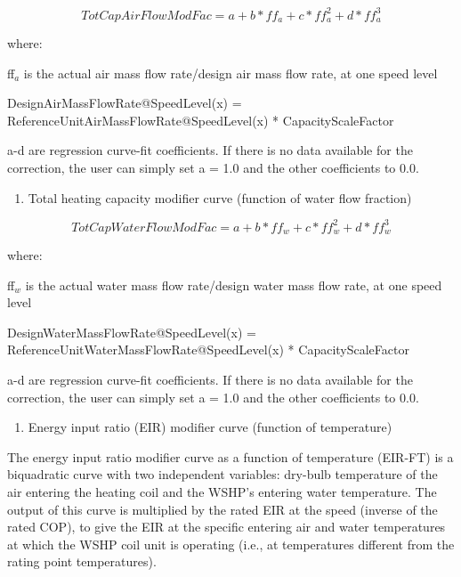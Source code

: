 \begin{equation}
TotCapAirFlowModFac = a + b*f{f_a} + c*ff_a^2 + d*ff_a^3
\end{equation}

where:

ff\(_{a}\) is the actual air mass flow rate/design air mass flow rate, at one speed level

DesignAirMassFlowRate@SpeedLevel(x) = ReferenceUnitAirMassFlowRate@SpeedLevel(x) * CapacityScaleFactor

a-d are regression curve-fit coefficients.  If there is no data available for the correction, the user can simply set a = 1.0 and the other coefficients to 0.0.

\begin{enumerate}
\def\labelenumi{\arabic{enumi})}
\setcounter{enumi}{2}
\tightlist
\item
  Total heating capacity modifier curve (function of water flow fraction)
\end{enumerate}

\begin{equation}
TotCapWaterFlowModFac = a + b*f{f_w} + c*ff_w^2 + d*ff_w^3
\end{equation}

where:

ff\(_{w}\) is the actual water mass flow rate/design water mass flow rate, at one speed level

DesignWaterMassFlowRate@SpeedLevel(x) = ReferenceUnitWaterMassFlowRate@SpeedLevel(x) * CapacityScaleFactor

a-d are regression curve-fit coefficients.  If there is no data available for the correction, the user can simply set a = 1.0 and the other coefficients to 0.0.

\begin{enumerate}
\def\labelenumi{\arabic{enumi})}
\setcounter{enumi}{3}
\tightlist
\item
  Energy input ratio (EIR) modifier curve (function of temperature)
\end{enumerate}

The energy input ratio modifier curve as a function of temperature (EIR-FT) is a biquadratic curve with two independent variables: dry-bulb temperature of the air entering the heating coil and the WSHP's entering water temperature. The output of this curve is multiplied by the rated EIR at the speed (inverse of the rated COP), to give the EIR at the specific entering air and water temperatures at which the WSHP coil unit is operating (i.e., at temperatures different from the rating point temperatures).


